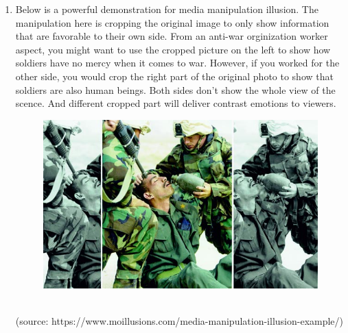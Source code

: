 \begin{enumerate}[label=\alph*., start=3]
\item Below is a powerful demonstration for media manipulation illusion. The manipulation here is cropping the original image to only show information that are favorable to their own side. From an anti-war orginization worker aspect, you might want to use the cropped picture on the left to show how soldiers have no mercy when it comes to war. However, if you worked for the other side, you would crop the right part of the original photo to show that soldiers are also human beings. Both sides don't show the whole view of the scence. And different cropped part will deliver contrast emotions to viewers.
\begin{figure}[htbp]
    \centering
    \includegraphics[scale=1.0]{A6_d.jpg}
\end{figure}
\\ (source: https://www.moillusions.com/media-manipulation-illusion-example/)
\end{enumerate}

